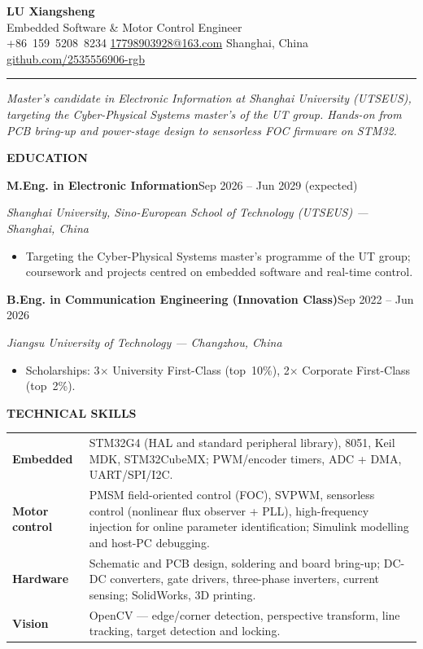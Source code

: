 \documentclass[10pt,a4paper]{article}
\newcommand{\cvsection}[1]{%
  \vspace{0.55em}%
  {\color{accent}\bfseries\large\MakeUppercase{#1}}\par
  \vspace{-0.50em}{\color{hairline}\rule{\linewidth}{0.7pt}}\par
  \vspace{0.20em}%
}
\newcommand{\cventry}[3]{%
  \textbf{#1}\hfill{\small\color{muted}#2}\par
  {\itshape #3}\par
}
\newenvironment{cvitems}{%
  \begin{itemize}[leftmargin=1.05em,labelsep=0.50em,itemsep=0.4pt,
                  topsep=1.0pt,parsep=0pt,partopsep=0pt]\small
}{\end{itemize}}
\begin{document}
{\Huge\bfseries LU Xiangsheng}\\[1pt]
{\large\color{accent}Embedded Software \& Motor Control Engineer}\\[6pt]
{\small
  +86~159~5208~8234 \;\textbullet\;
  \href{mailto:17798903928@163.com}{17798903928@163.com} \;\textbullet\;
  Shanghai, China \;\textbullet\;
  \href{https://github.com/2535556906-rgb}{github.com/2535556906-rgb}%
}\\[6pt]
{\color{accent}\rule{\linewidth}{1.3pt}}

{\small\itshape
  Master's candidate in Electronic Information at Shanghai University (UTSEUS),
  targeting the Cyber-Physical Systems master's of the UT group. Hands-on from
  PCB bring-up and power-stage design to sensorless FOC firmware on STM32.
}

\cvsection{Education}

\cventry{M.Eng. in Electronic Information}{Sep 2026 -- Jun 2029 (expected)}%
  {Shanghai University, Sino-European School of Technology (UTSEUS) --- Shanghai, China}
\begin{cvitems}
  \item Targeting the Cyber-Physical Systems master's programme of the UT group;
        coursework and projects centred on embedded software and real-time control.
\end{cvitems}

\cventry{B.Eng. in Communication Engineering (Innovation Class)}{Sep 2022 -- Jun 2026}%
  {Jiangsu University of Technology --- Changzhou, China}
\begin{cvitems}
  \item Scholarships: 3$\times$ University First-Class (top~10\%), 2$\times$ Corporate First-Class (top~2\%).
\end{cvitems}

\cvsection{Technical Skills}
{\small
\renewcommand{\arraystretch}{1.16}%
\begin{tabular}{@{}>{\raggedright\arraybackslash\bfseries}p{2.85cm}p{14.65cm}@{}}
Embedded     & STM32G4 (HAL and standard peripheral library), 8051, Keil MDK, STM32CubeMX; PWM/encoder timers, ADC + DMA, UART/SPI/I2C. \\
Motor control & PMSM field-oriented control (FOC), SVPWM, sensorless control (nonlinear flux observer + PLL), high-frequency injection for online parameter identification; Simulink modelling and host-PC debugging. \\
Hardware     & Schematic and PCB design, soldering and board bring-up; DC-DC converters, gate drivers, three-phase inverters, current sensing; SolidWorks, 3D printing. \\
Vision       & OpenCV --- edge/corner detection, perspective transform, line tracking, target detection and locking. \\
\end{tabular}}
\end{document}

